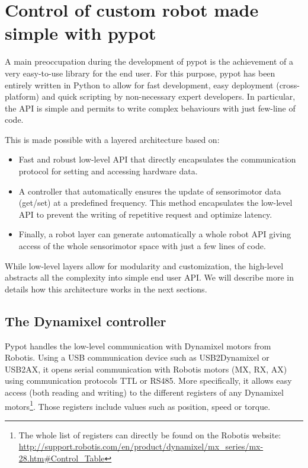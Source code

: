 \section{Control of custom robot made simple with pypot} %

A main preoccupation during the development of pypot is the achievement of a very easy-to-use library for the end user. For this purpose, pypot has been entirely written in Python to allow for fast development, easy deployment (cross-platform) and quick scripting by non-necessary expert developers. In particular, the API is simple and permits to write complex behaviours with just few-line of code.

This is made possible with a layered architecture based on:

\begin{itemize}
    \item Fast and robust low-level API that directly encapsulates the communication protocol for setting and accessing hardware data.
    \item A controller that automatically ensures the update of sensorimotor data (get/set) at a predefined frequency. This method encapsulates the low-level API to prevent the writing of repetitive request and optimize latency.
    \item Finally, a robot layer can generate automatically a whole robot API giving access of the whole sensorimotor space with just a few lines of code.
\end{itemize}

While low-level layers allow for modularity and customization, the high-level abstracts all the complexity into simple end user API. We will describe more in details how this architecture works in the next sections.


\subsection{The Dynamixel controller} %

Pypot handles the low-level communication with Dynamixel motors from Robotis. Using a USB communication device such as USB2Dynamixel or USB2AX, it opens serial communication with Robotis motors (MX, RX, AX) using communication protocols TTL or RS485. More specifically, it allows easy access (both reading and writing) to the different registers of any Dynamixel motors\footnote{The whole list of registers can directly be found on the Robotis website: \url{http://support.robotis.com/en/product/dynamixel/mx_series/mx-28.htm\#Control_Table}}. Those registers include values such as position, speed or torque.


